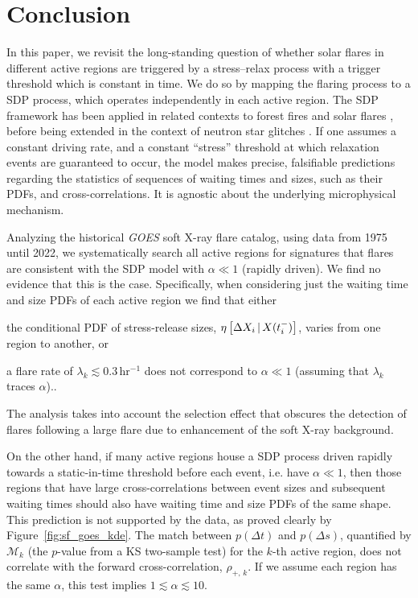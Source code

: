 \section{Conclusion} \label{sec:sf_conclusion}
In this paper, we revisit the long-standing question of whether solar flares in different active regions are triggered by a stress--relax process with a trigger threshold which is constant in time. We do so by mapping the flaring process to a SDP process, which operates independently in each active region. The SDP framework has been applied in related contexts to forest fires \citep{Daly2006} and solar flares \citep{Wheatland2008}, before being extended in the context of neutron star glitches \citep{Fulgenzi2017, Melatos2018, Carlin2019quasi, Carlin2019ac}. If one assumes a constant driving rate, and a constant ``stress'' threshold at which relaxation events are guaranteed to occur, the model makes precise, falsifiable predictions regarding the statistics of sequences of waiting times and sizes, such as their PDFs, and cross-correlations. It is agnostic about the underlying microphysical mechanism.

Analyzing the historical \emph{GOES} soft X-ray flare catalog, using data from 1975 until 2022, we systematically search all active regions for signatures that flares are consistent with the SDP model with $\alpha \ll 1$ (rapidly driven). We find no evidence that this is the case. Specifically, when considering just the waiting time and size PDFs of each active region we find that either \begin{enumerate*} \item the conditional PDF of stress-release sizes, $\eta\left[\Delta X_{i}\,|\,X(t_i^-)\right]$, varies from one region to another, or \item a flare rate of $\lambda_k \lesssim 0.3\,$hr$^{-1}$ does not correspond to $\alpha \ll 1$ (assuming that $\lambda_k$ traces $\alpha$)..\end{enumerate*} The analysis takes into account the selection effect that obscures the detection of flares following a large flare due to enhancement of the soft X-ray background.

On the other hand, if many active regions house a SDP process driven rapidly towards a static-in-time threshold before each event, i.e. have $\alpha \ll 1$, then those regions that have large cross-correlations between event sizes and subsequent waiting times should also have waiting time and size PDFs of the same shape. This prediction is not supported by the data, as proved clearly by Figure~\ref{fig:sf_goes_kde}. The match between $p(\Delta t)$ and $p(\Delta s)$, quantified by $\mathcal{M}_k$ (the $p$-value from a KS two-sample test) for the $k$-th active region, does not correlate with the forward cross-correlation, $\rho_{+,\,k}$. If we assume each region has the same $\alpha$, this test implies $1 \lesssim \alpha \lesssim 10$.

